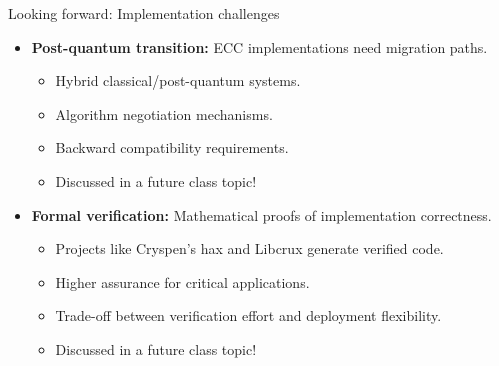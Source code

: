 \documentclass[aspectratio=169, lualatex, handout]{beamer}
\begin{document}
\begin{frame}{Looking forward: Implementation challenges}
	\begin{itemize}
		\item \textbf{Post-quantum transition:} ECC implementations need migration paths.
		      \begin{itemize}
			      \item Hybrid classical/post-quantum systems.
			      \item Algorithm negotiation mechanisms.
			      \item Backward compatibility requirements.
			      \item Discussed in a future class topic!
		      \end{itemize}
		\item \textbf{Formal verification:} Mathematical proofs of implementation correctness.
		      \begin{itemize}
			      \item Projects like Cryspen's hax and Libcrux generate verified code.
			      \item Higher assurance for critical applications.
			      \item Trade-off between verification effort and deployment flexibility.
			      \item Discussed in a future class topic!
		      \end{itemize}
	\end{itemize}
\end{frame}

\begin{frame}[plain]
	\titlepage
\end{frame}
\end{document}
